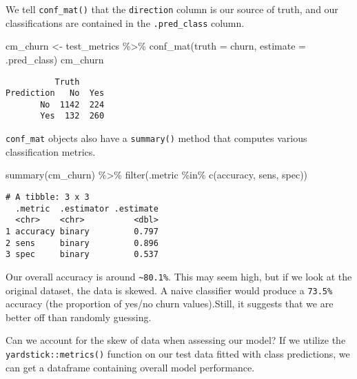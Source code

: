 \documentclass[
]{article}
\newenvironment{Shaded}{\begin{snugshade}}{\end{snugshade}}
\newcommand{\AttributeTok}[1]{\textcolor[rgb]{0.77,0.63,0.00}{#1}}
\newcommand{\FunctionTok}[1]{\textcolor[rgb]{0.00,0.00,0.00}{#1}}
\newcommand{\NormalTok}[1]{#1}
\newcommand{\OtherTok}[1]{\textcolor[rgb]{0.56,0.35,0.01}{#1}}
\newcommand{\SpecialCharTok}[1]{\textcolor[rgb]{0.00,0.00,0.00}{#1}}
\newcommand{\StringTok}[1]{\textcolor[rgb]{0.31,0.60,0.02}{#1}}
\begin{document}
We tell \texttt{conf\_mat()} that the \texttt{direction} column is our
source of truth, and our classifications are contained in the
\texttt{.pred\_class} column.

\begin{Shaded}
\begin{Highlighting}[]
\NormalTok{cm\_churn }\OtherTok{\textless{}{-}}\NormalTok{ test\_metrics }\SpecialCharTok{\%\textgreater{}\%}
  \FunctionTok{conf\_mat}\NormalTok{(}\AttributeTok{truth =}\NormalTok{ churn, }\AttributeTok{estimate =}\NormalTok{ .pred\_class)}
\NormalTok{cm\_churn}
\end{Highlighting}
\end{Shaded}

\begin{verbatim}
          Truth
Prediction   No  Yes
       No  1142  224
       Yes  132  260
\end{verbatim}

\texttt{conf\_mat} objects also have a \texttt{summary()} method that
computes various classification metrics.

\begin{Shaded}
\begin{Highlighting}[]
\FunctionTok{summary}\NormalTok{(cm\_churn) }\SpecialCharTok{\%\textgreater{}\%}
  \FunctionTok{filter}\NormalTok{(.metric }\SpecialCharTok{\%in\%} \FunctionTok{c}\NormalTok{(}\StringTok{\textquotesingle{}accuracy\textquotesingle{}}\NormalTok{, }\StringTok{\textquotesingle{}sens\textquotesingle{}}\NormalTok{, }\StringTok{\textquotesingle{}spec\textquotesingle{}}\NormalTok{))}
\end{Highlighting}
\end{Shaded}

\begin{verbatim}
# A tibble: 3 x 3
  .metric  .estimator .estimate
  <chr>    <chr>          <dbl>
1 accuracy binary         0.797
2 sens     binary         0.896
3 spec     binary         0.537
\end{verbatim}

Our overall accuracy is around \texttt{\textasciitilde{}80.1\%}. This
may seem high, but if we look at the original dataset, the data is
skewed. A naive classifier would produce a \texttt{73.5\%} accuracy (the
proportion of yes/no churn values).Still, it suggests that we are better
off than randomly guessing.

Can we account for the skew of data when assessing our model? If we
utilize the \texttt{yardstick::metrics()} function on our test data
fitted with class predictions, we can get a dataframe containing overall
model performance.
\end{document}
